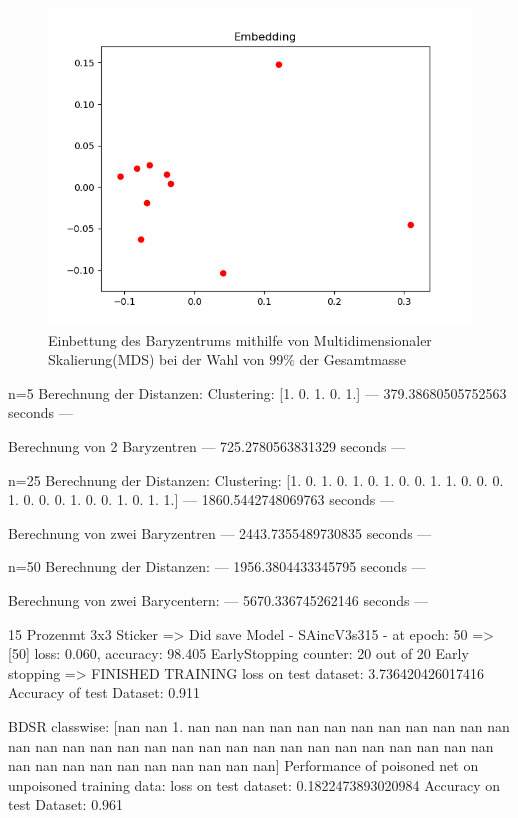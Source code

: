 \documentclass[twoside, 12pt,a4paper]{article}
\numberwithin{equation}{section}
\begin{document}
	\begin{figure}[h]
		\begin{center}
			\includegraphics[width=0.5\textheight]{bary_embedding99.png}
			\caption{Einbettung des Baryzentrums mithilfe von Multidimensionaler Skalierung(MDS) bei der Wahl von $99\%$ der Gesamtmasse}
		\end{center}
	\end{figure}


	n=5
	Berechnung der Distanzen:
	Clustering:  [1. 0. 1. 0. 1.]
	--- 379.38680505752563 seconds ---
	
	Berechnung von 2 Baryzentren
	--- 725.2780563831329 seconds ---
	
	n=25
	Berechnung der Distanzen:
	Clustering:  [1. 0. 1. 0. 1. 0. 1. 0. 0. 1. 1. 0. 0. 0. 1. 0. 0. 0. 1. 0. 0. 1. 0. 1.
	1.]
	--- 1860.5442748069763 seconds ---
	
	Berechnung von zwei Baryzentren
	--- 2443.7355489730835 seconds ---
	
	n=50
	Berechnung der Distanzen:
	--- 1956.3804433345795 seconds ---
	
	Berechnung von zwei Barycentern:
	--- 5670.336745262146 seconds ---
	
	15 Prozenmt 3x3 Sticker
	=> Did save Model - SAincV3s315 - at epoch: 50
	=>	[50] loss: 0.060, accuracy: 98.405%
	EarlyStopping counter: 20 out of 20
	Early stopping
	=>	FINISHED TRAINING
	loss on test dataset: 3.736420426017416
	Accuracy of test Dataset: 0.911 
	
	BDSR classwise:
	[nan nan  1. nan nan nan nan nan nan nan nan nan nan nan nan nan nan nan
	nan nan nan nan nan nan nan nan nan nan nan nan nan nan nan nan nan nan
	nan nan nan nan nan nan nan]
	Performance of poisoned net on unpoisoned training data:
	loss on test dataset: 0.1822473893020984
	Accuracy on test Dataset: 0.961 
	
\end{document}
